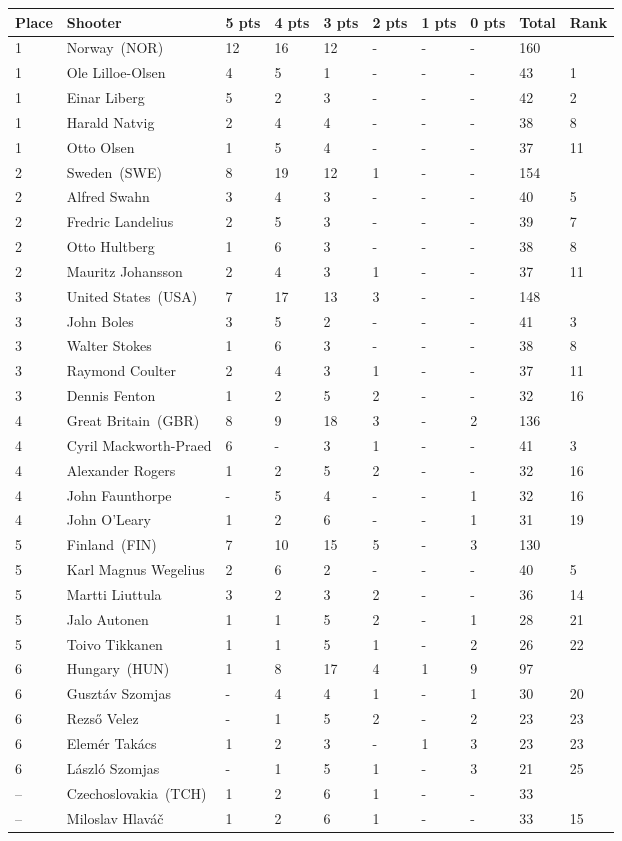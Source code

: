 \documentclass{article}
\begin{document}
\begin{tabular}{llllllllll}
\toprule
Place & Shooter & 5 pts & 4 pts & 3 pts & 2 pts & 1 pts & 0 pts & Total & Rank \\
\midrule
1 & Norway (NOR) & 12 & 16 & 12 & - & - & - & 160 &  \\
1 & Ole Lilloe-Olsen & 4 & 5 & 1 & - & - & - & 43 & 1 \\
1 & Einar Liberg & 5 & 2 & 3 & - & - & - & 42 & 2 \\
1 & Harald Natvig & 2 & 4 & 4 & - & - & - & 38 & 8 \\
1 & Otto Olsen & 1 & 5 & 4 & - & - & - & 37 & 11 \\
2 & Sweden (SWE) & 8 & 19 & 12 & 1 & - & - & 154 &  \\
2 & Alfred Swahn & 3 & 4 & 3 & - & - & - & 40 & 5 \\
2 & Fredric Landelius & 2 & 5 & 3 & - & - & - & 39 & 7 \\
2 & Otto Hultberg & 1 & 6 & 3 & - & - & - & 38 & 8 \\
2 & Mauritz Johansson & 2 & 4 & 3 & 1 & - & - & 37 & 11 \\
3 & United States (USA) & 7 & 17 & 13 & 3 & - & - & 148 &  \\
3 & John Boles & 3 & 5 & 2 & - & - & - & 41 & 3 \\
3 & Walter Stokes & 1 & 6 & 3 & - & - & - & 38 & 8 \\
3 & Raymond Coulter & 2 & 4 & 3 & 1 & - & - & 37 & 11 \\
3 & Dennis Fenton & 1 & 2 & 5 & 2 & - & - & 32 & 16 \\
4 & Great Britain (GBR) & 8 & 9 & 18 & 3 & - & 2 & 136 &  \\
4 & Cyril Mackworth-Praed & 6 & - & 3 & 1 & - & - & 41 & 3 \\
4 & Alexander Rogers & 1 & 2 & 5 & 2 & - & - & 32 & 16 \\
4 & John Faunthorpe & - & 5 & 4 & - & - & 1 & 32 & 16 \\
4 & John O'Leary & 1 & 2 & 6 & - & - & 1 & 31 & 19 \\
5 & Finland (FIN) & 7 & 10 & 15 & 5 & - & 3 & 130 &  \\
5 & Karl Magnus Wegelius & 2 & 6 & 2 & - & - & - & 40 & 5 \\
5 & Martti Liuttula & 3 & 2 & 3 & 2 & - & - & 36 & 14 \\
5 & Jalo Autonen & 1 & 1 & 5 & 2 & - & 1 & 28 & 21 \\
5 & Toivo Tikkanen & 1 & 1 & 5 & 1 & - & 2 & 26 & 22 \\
6 & Hungary (HUN) & 1 & 8 & 17 & 4 & 1 & 9 & 97 &  \\
6 & Gusztáv Szomjas & - & 4 & 4 & 1 & - & 1 & 30 & 20 \\
6 & Rezső Velez & - & 1 & 5 & 2 & - & 2 & 23 & 23 \\
6 & Elemér Takács & 1 & 2 & 3 & - & 1 & 3 & 23 & 23 \\
6 & László Szomjas & - & 1 & 5 & 1 & - & 3 & 21 & 25 \\
– & Czechoslovakia (TCH) & 1 & 2 & 6 & 1 & - & - & 33 &  \\
– & Miloslav Hlaváč & 1 & 2 & 6 & 1 & - & - & 33 & 15 \\
\bottomrule
\end{tabular}
\end{document}
